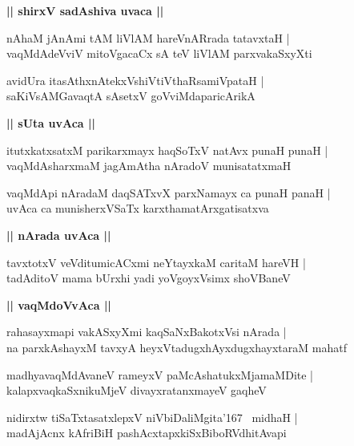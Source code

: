 \documentclass[twoside,12pt,openright]{book}
\newcounter{shloka}[chapter]
\def\uvaca#1{\centerline{{\large\textbf{#1}}}}
\begin{document}
\uvaca{|| shirxV sadAshiva uvaca ||}

\begin{shloka}%
nAhaM jAnAmi tAM liVlAM hareVnARrada tatavxtaH |\\
vaqMdAdeVviV mitoVgacaCx sA teV liVlAM parxvakaSxyXti
\end{shloka}

\begin{shloka}%
avidUra itasAthxnAtekxVshiVtiVthaRsamiVpataH |\\
saKiVsAMGavaqtA sAsetxV goVviMdaparicArikA
\end{shloka}

\uvaca{|| sUta uvAca ||}

\begin{shloka}%
itutxkatxsatxM parikarxmayx haqSoTxV natAvx punaH punaH |\\
vaqMdAsharxmaM jagAmAtha nAradoV munisatatxmaH 
\end{shloka}

\begin{shloka}%
vaqMdApi nAradaM daqSATxvX parxNamayx ca punaH panaH |\\
uvAca ca munisherxVSaTx karxthamatArxgatisatxva
\end{shloka}

\uvaca{|| nArada uvAca ||}

\begin{shloka}%
tavxtotxV veVditumicACxmi neYtayxkaM caritaM hareVH |\\
tadAditoV mama bUrxhi yadi yoVgoyxVsimx shoVBaneV
\end{shloka}

\uvaca{|| vaqMdoVvAca ||}

\begin{shloka}%
rahasayxmapi vakASxyXmi kaqSaNxBakotxVsi nArada |\\
na parxkAshayxM tavxyA heyxVtadugxhAyxdugxhayxtaraM mahatf 
\end{shloka}

\begin{shloka}%
madhyavaqMdAvaneV rameyxV paMcAshatukxMjamaMDite |\\
kalapxvaqkaSxnikuMjeV divayxratanxmayeV gaqheV 
\end{shloka}

\begin{shloka}%
nidirxtw tiSaTxtasatxlepxV niVbiDaliMgita\char'167 ~midhaH |\\
madAjAcnx kAfriBiH pashAcxtapxkiSxBiboRVdhitAvapi
\end{shloka}
\end{document}
